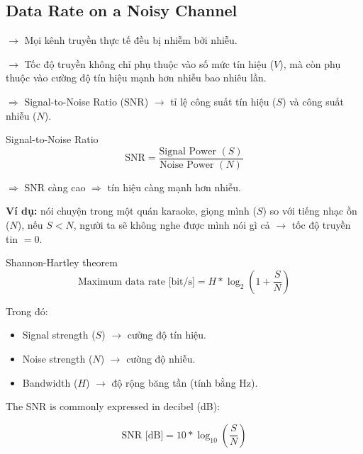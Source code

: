 \subsection{Data Rate on a Noisy Channel}

\noindent
$\rightarrow$ Mọi kênh truyền thực tế đều bị nhiễm bởi nhiễu.
\medskip

\noindent
$\rightarrow$ Tốc độ truyền không chỉ phụ thuộc vào số mức tín hiệu ($V$), mà còn phụ thuộc vào cường độ tín hiệu mạnh hơn nhiễu bao nhiêu lần.

$\Rightarrow$ Signal-to-Noise Ratio (SNR) $\rightarrow$ tỉ lệ công suất tín hiệu ($S$) và công suất nhiễu ($N$).
\medskip

\begin{mybox}{Signal-to-Noise Ratio}
\begin{equation*}
    \text{SNR} = \frac{\text{Signal Power }(S)}{\text{Noise Power }(N)}
\end{equation*}
\end{mybox}

\noindent
$\Rightarrow$ SNR càng cao $\Rightarrow$ tín hiệu càng mạnh hơn nhiễu.
\medskip

\noindent
\textbf{Ví dụ:} nói chuyện trong một quán karaoke, giọng mình ($S$) so với tiếng nhạc ồn ($N$), nếu $S < N$, người ta sẽ không nghe được mình nói gì cả $\rightarrow$ tốc độ truyền tin $= 0$.
\medskip

\begin{mybox}{Shannon-Hartley theorem}
\begin{equation*}
    \text{Maximum data rate [bit/s]} = H * \log_2(1 + \frac{S}{N})
\end{equation*}
\end{mybox}

\noindent
Trong đó:

\begin{itemize}
    \item Signal strength ($S$) $\rightarrow$ cường độ tín hiệu.
    \item Noise strength ($N$) $\rightarrow$ cường độ nhiễu.
    \item Bandwidth ($H$) $\rightarrow$ độ rộng băng tần (tính bằng Hz).
\end{itemize}
\medskip

\noindent
The SNR is commonly expressed in decibel (dB):

\begin{equation*}
    \text{SNR [dB]} = 10 * \log_{10}(\frac{S}{N})
\end{equation*}
\medskip

